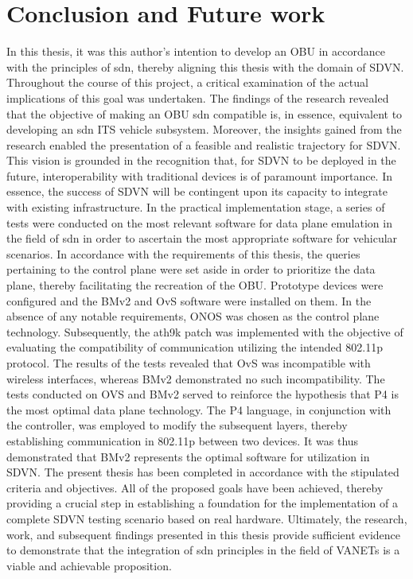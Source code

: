 \chapter{Conclusion and Future work}
\label{cha:conclusion}

In this thesis, it was this author's intention to develop an OBU in accordance with the principles of \gls{sdn}, thereby aligning this thesis with the domain of SDVN. Throughout the course of this project, a critical examination of the actual implications of this goal was undertaken. The findings of the research revealed that the objective of making an OBU \gls{sdn} compatible is, in essence, equivalent to developing an \gls{sdn} ITS vehicle subsystem. Moreover, the insights gained from the research enabled the presentation of a feasible and realistic trajectory for SDVN. This vision is grounded in the recognition that, for SDVN to be deployed in the future, interoperability with traditional devices is of paramount importance. In essence, the success of SDVN will be contingent upon its capacity to integrate with existing infrastructure.
In the practical implementation stage, a series of tests were conducted on the most relevant software for data plane emulation in the field of \gls{sdn} in order to ascertain the most appropriate software for vehicular scenarios. In accordance with the requirements of this thesis, the queries pertaining to the control plane were set aside in order to prioritize the data plane, thereby facilitating the recreation of the OBU. 
Prototype devices were configured and the BMv2 and OvS software were installed on them. In the absence of any notable requirements, ONOS was chosen as the control plane technology. Subsequently, the ath9k patch was implemented with the objective of evaluating the compatibility of communication utilizing the intended 802.11p protocol. The results of the tests revealed that OvS was incompatible with wireless interfaces, whereas BMv2 demonstrated no such incompatibility.
The tests conducted on OVS and BMv2 served to reinforce the hypothesis that P4 is the most optimal data plane technology. The P4 language, in conjunction with the controller, was employed to modify the subsequent layers, thereby establishing communication in 802.11p between two devices. It was thus demonstrated that BMv2 represents the optimal software for utilization in SDVN. 
The present thesis has been completed in accordance with the stipulated criteria and objectives. All of the proposed goals have been achieved, thereby providing a crucial step in establishing a foundation for the implementation of a complete SDVN testing scenario based on real hardware. Ultimately, the research, work, and subsequent findings presented in this thesis provide sufficient evidence to demonstrate that the integration of \gls{sdn} principles in the field of VANETs is a viable and achievable proposition.

